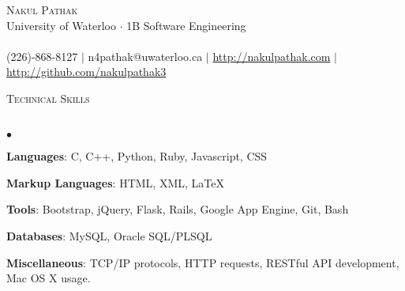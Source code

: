 \documentclass[10pt]{article}
\newcommand{\lineunder}{\vspace*{-8pt} \\ \hspace*{-18pt} \hrulefill \\}
\newcommand{\header}[1]{{\hspace*{-15pt}\vspace*{6pt} \textsc{#1}} \vspace*{-6pt} \lineunder}
\newenvironment{achievements}{\begin{list}{$\bullet$}{\topsep 0pt \itemsep -1.5pt \leftmargin 5pt}}{\vspace*{4pt}\end{list}}
\begin{document}
\small
\smallskip
\vspace*{-45pt}

\begin{center}
	{\Huge \scshape {Nakul Pathak}} \\
\vspace*{6pt} 
{\fontsize{10}{1}\selectfont University of Waterloo $\cdot$ 1B Software Engineering} \\
\vspace{-4pt}
\hspace*{-18pt} \hrulefill \\
\vspace{2pt}
\hspace*{-18pt} (226)-868-8127 $|$ n4pathak@uwaterloo.ca $|$ \url{http://nakulpathak.com} $|$  \url{http://github.com/nakulpathak3}
\vspace{-5pt}
\end{center}


\vspace{5pt}
\header{\normalsize Technical Skills}
\begin{achievements}
\item \textbf{Languages}: C, C++, Python, Ruby, Javascript, CSS
\item \textbf{Markup Languages}: HTML, XML, LaTeX
\item \textbf{Tools}: Bootstrap, jQuery, Flask, Rails, Google App Engine, Git, Bash
\item \textbf{Databases}: MySQL, Oracle SQL/PLSQL
\item \textbf{Miscellaneous}: TCP/IP protocols, HTTP requests, RESTful API development, Mac OS X usage.
\end{achievements}

\vspace{5pt}
\end{document}
